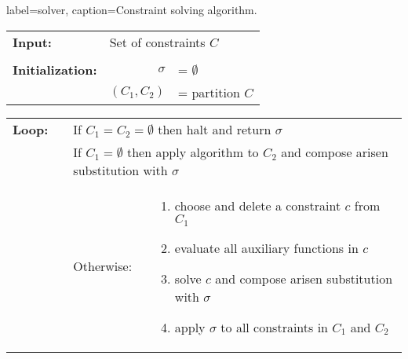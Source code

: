 \begin{taplfigureT}{label=solver, caption={Constraint solving algorithm.}}

{\setlength{\tabcolsep}{2pt}
\begin{tabular}{@{}l r p{5cm}@{}}
\textbf{Input:}          & \multicolumn{2}{l}{Set of constraints $C$} \\
                         & & \\
                         
\textbf{Initialization:} & $\sigma$     & = $\emptyset$ \\
                         & $(C_1, C_2)$ & = partition $C$ \\
\end{tabular}}

\bigskip
{\setlength{\tabcolsep}{1pt}
\renewcommand{\arraystretch}{1.5}
\begin{tabular}{l l p{9cm}}
\textbf{Loop:}~~
& \multicolumn{2}{l}{If $C_1 = C_2 = \emptyset$ then
                     halt and return $\sigma$} \\
& \multicolumn{2}{p{10cm}}{If $C_1 = \emptyset$ then
                          apply algorithm to $C_2$ and
                          compose arisen substitution with $\sigma$} \\
& Otherwise: & \vspace{-15.5pt}
               \begin{enumerate}
               \item choose and delete a constraint $c$ from $C_1$
               \item evaluate all auxiliary functions in $c$
               \item solve $c$ and compose arisen
                 substitution with $\sigma$
               \item apply $\sigma$ to all constraints
                 in $C_1$ and $C_2$
              \end{enumerate} \\
\end{tabular}}
\vspace{-1.5em}
\end{taplfigureT}
